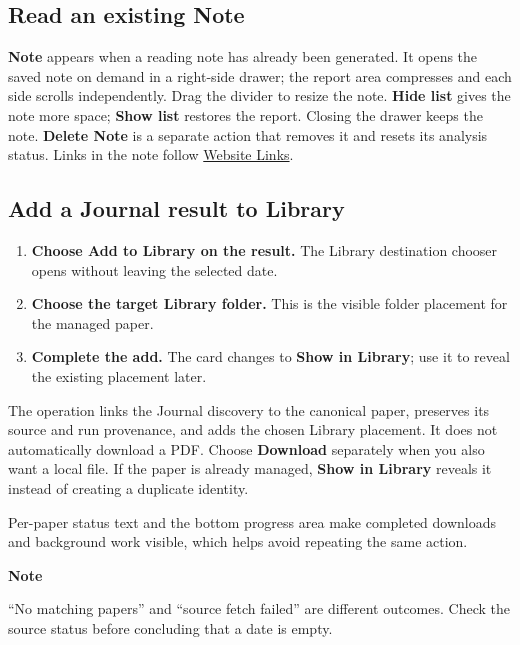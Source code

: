 \documentclass[10pt,letterpaper,oneside]{scrreprt}
\providecommand{\tightlist}{\setlength{\itemsep}{1pt}\setlength{\parskip}{0pt}}
\renewenvironment{quote}
  {\Needspace{5\baselineskip}\begin{tcolorbox}[enhanced,breakable,colback=GewuPale,colframe=GewuPale,boxrule=0pt,
    borderline west={1.6pt}{0pt}{GewuBlue},arc=1.2mm,left=2.5mm,right=2.5mm,top=1.7mm,bottom=1.7mm,
    before skip=4pt,after skip=5pt,fontupper=\color{GewuInk}\small]}
  {\end{tcolorbox}}
\begin{document}
\subsection{Read an existing Note}\label{read-an-existing-note}

\textbf{Note} appears when a reading note has already been generated. It opens the saved note on demand in a right-side drawer; the report area compresses and each side scrolls independently. Drag the divider to resize the note. \textbf{Hide list} gives the note more space; \textbf{Show list} restores the report. Closing the drawer keeps the note. \textbf{Delete Note} is a separate action that removes it and resets its analysis status. Links in the note follow \hyperref[website-link-settings]{Website Links}.

\subsection{Add a Journal result to Library}\label{add-a-journal-result-to-library}

\begin{enumerate}
\tightlist
\item
  \textbf{Choose \textbf{Add to Library} on the result.} The Library destination chooser opens without leaving the selected date.
\item
  \textbf{Choose the target Library folder.} This is the visible folder placement for the managed paper.
\item
  \textbf{Complete the add.} The card changes to \textbf{Show in Library}; use it to reveal the existing placement later.
\end{enumerate}

The operation links the Journal discovery to the canonical paper, preserves its source and run provenance, and adds the chosen Library placement. It does not automatically download a PDF. Choose \textbf{Download} separately when you also want a local file. If the paper is already managed, \textbf{Show in Library} reveals it instead of creating a duplicate identity.

Per-paper status text and the bottom progress area make completed downloads and background work visible, which helps avoid repeating the same action.

\begin{quote}
\textbf{Note}

``No matching papers'' and ``source fetch failed'' are different outcomes. Check the source status before concluding that a date is empty.
\end{quote}
\end{document}
